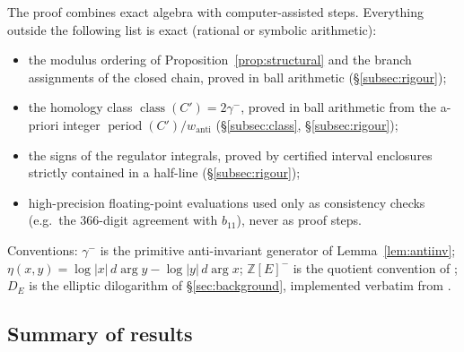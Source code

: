 \documentclass[preprint,12pt]{elsarticle}
\theoremstyle{definition}
\theoremstyle{remark}
\newcommand{\Z}{\mathbb{Z}}
\DeclareMathOperator{\period}{period}
\DeclareMathOperator{\class}{class}
\begin{document}
The proof combines exact algebra with computer-assisted steps. Everything
outside the following list is exact (rational or symbolic arithmetic):
\begin{itemize}
  \item the modulus ordering of Proposition~\ref{prop:structural} and the
  branch assignments of the closed chain, proved in ball arithmetic
  (\S\ref{subsec:rigour});
  \item the homology class $\class(C')=2\gamma^-$, proved in ball arithmetic
  from the a-priori integer $\period(C')/w_{\mathrm{anti}}$
  (\S\ref{subsec:class}, \S\ref{subsec:rigour});
  \item the signs of the regulator integrals, proved by certified interval
  enclosures strictly contained in a half-line (\S\ref{subsec:rigour});
  \item high-precision floating-point evaluations used only as consistency
  checks (e.g.\ the $366$-digit agreement with $b_{11}$), never as proof
  steps.
\end{itemize}
Conventions: $\gamma^-$ is the primitive anti-invariant generator of
Lemma~\ref{lem:antiinv}; $\eta(x,y)=\log|x|\,d\arg y-\log|y|\,d\arg x$;
$\Z[E]^-$ is the quotient convention of \cite{LalinRam}; $D_E$ is the
elliptic dilogarithm of \S\ref{sec:background}, implemented verbatim from
\cite[Def.~5, eq.~(10)]{LalinRam}.

\subsection{Summary of results}
\end{document}
